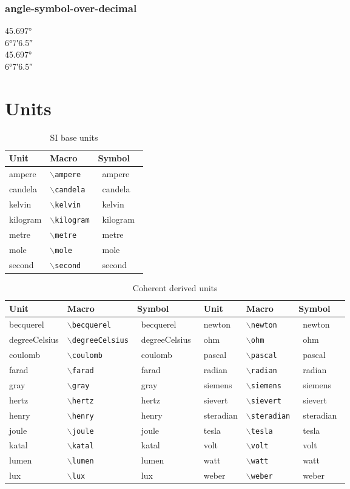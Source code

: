 \documentclass{article}
\begin{document}
\subsubsection{angle-symbol-over-decimal}
\ang{45.697} \\
\ang{6;7;6.5} \\
\ang[angle-symbol-over-decimal]{45.697} \\
\ang[angle-symbol-over-decimal]{6;7;6.5}



\section{Units}
\def\showunit#1{#1 & \texttt{$\backslash$#1} & \si{\csname#1\endcsname}}
\begin{table}
\caption{SI base units}
\centering
\begin{tabular}{lll}\hline\hline
Unit & Macro & Symbol \\\hline
\showunit{ampere}\\
\showunit{candela}\\
\showunit{kelvin}\\
\showunit{kilogram}\\
\showunit{metre}\\
\showunit{mole}\\
\showunit{second}\\
\end{tabular}
\end{table}

\begin{table}
\caption{Coherent derived units}
\centering
\begin{tabular}{llllll}\hline\hline
Unit & Macro & Symbol &
Unit & Macro & Symbol \\\hline
\showunit{becquerel}     & \showunit{newton} \\
\showunit{degreeCelsius} & \showunit{ohm} \\
\showunit{coulomb}       & \showunit{pascal} \\
\showunit{farad}         & \showunit{radian} \\
\showunit{gray}          & \showunit{siemens} \\
\showunit{hertz}         & \showunit{sievert} \\
\showunit{henry}         & \showunit{steradian} \\
\showunit{joule}         & \showunit{tesla} \\
\showunit{katal}         & \showunit{volt} \\
\showunit{lumen}         & \showunit{watt} \\
\showunit{lux}           & \showunit{weber} \\
\end{tabular}
\end{table}
\end{document}
